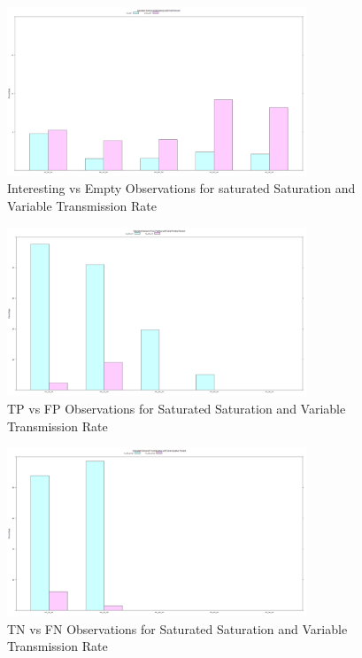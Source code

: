 	\begin{figure}[H]
	\centering
	\includegraphics[width=0.8\textwidth]{Chap7/figures/plots/saturated_variable/emptvsint_percent.png}
	\caption{Interesting vs Empty Observations for saturated Saturation and Variable Transmission Rate}
	\label{fig:sim:res:sat:variable:emptint}
	\end{figure}

	\begin{figure}[H]
	\centering
	\includegraphics[width=0.8\textwidth]{Chap7/figures/plots/saturated_variable/tpvsfp_percent.png}
	\caption{TP vs FP Observations for Saturated Saturation and Variable Transmission Rate}
	\label{fig:sim:res:sat:variable:tpfp}
	\end{figure}

	\begin{figure}[H]
	\centering
	\includegraphics[width=0.8\textwidth]{Chap7/figures/plots/saturated_variable/tnvsfn_percent.png}
	\caption{TN vs FN Observations for Saturated Saturation and Variable Transmission Rate}
	\label{fig:sim:res:sat:variable:tnfn}
	\end{figure}

